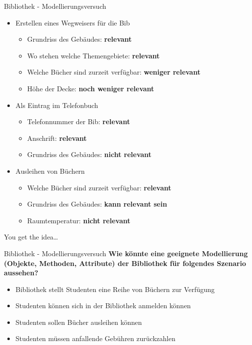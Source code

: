 \documentclass[18pt]{beamer}
\begin{document}
\begin{frame}{Bibliothek - Modellierungsversuch}
    \begin{itemize}
        \item Erstellen eines Wegweisers für die Bib
        \begin{itemize}
            \item Grundriss des Gebäudes: \textbf{relevant}
            \item Wo stehen welche Themengebiete: \textbf{relevant}
            \item Welche Bücher sind zurzeit verfügbar: \textbf{weniger relevant}
            \item Höhe der Decke: \textbf{noch weniger relevant}
        \end{itemize}
        \pause
        \item Als Eintrag im Telefonbuch
        \begin{itemize}
            \item Telefonnummer der Bib: \textbf{relevant}
            \item Anschrift: \textbf{relevant}
            \item Grundriss des Gebäudes: \textbf{nicht relevant}
        \end{itemize}
        \pause
        \item Ausleihen von Büchern
        \begin{itemize}
            \item Welche Bücher sind zurzeit verfügbar: \textbf{relevant}
            \item Grundriss des Gebäudes: \textbf{kann relevant sein}
            \item Raumtemperatur: \textbf{nicht relevant}
        \end{itemize}
    \end{itemize}
    You get the idea\dots
\end{frame}

\begin{frame}{Bibliothek - Modellierungsversuch}
    \textbf{Wie könnte eine geeignete Modellierung (Objekte, Methoden, Attribute) der \textbf{Bibliothek} für folgendes Szenario aussehen?}
    \vspace{.1in}
    \begin{itemize}
        \item Bibliothek stellt Studenten eine Reihe von Büchern zur Verfügung
        \item Studenten können sich in der Bibliothek anmelden können
        \item Studenten sollen Bücher ausleihen können
        \item Studenten müssen anfallende Gebühren zurückzahlen
    \end{itemize}
\end{frame}
\end{document}
